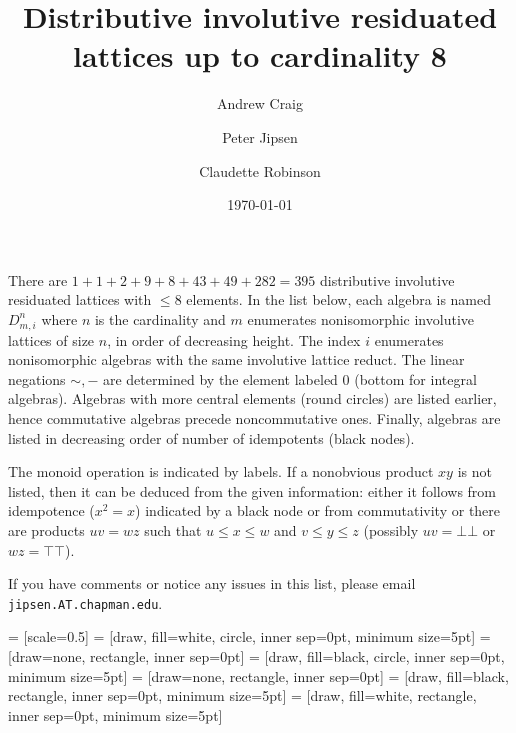 \documentclass{amsart}
\title{Distributive involutive residuated lattices up to cardinality 8}
\author{Andrew Craig}
\author{Peter Jipsen}
\author{Claudette Robinson}
\date{\today}
\begin{document}
\maketitle

\noindent
There are $1+1+2+9+8+43+49+282=395$ distributive involutive residuated lattices with $\le 8$ elements.
In the list below, each algebra is named $D^{n}_{m,i}$ where $n$ is the 
cardinality and $m$ enumerates nonisomorphic involutive lattices of size $n$, in order
of decreasing height. The index $i$ enumerates nonisomorphic algebras with the same involutive lattice
reduct. The linear negations $\sim,-$ are determined by the element labeled $0$ (bottom for integral algebras).
Algebras with more central elements (round 
circles) are listed earlier, hence commutative algebras precede 
noncommutative ones. Finally, algebras are listed in decreasing order of 
number of idempotents (black nodes).

The monoid operation is indicated by labels. If a nonobvious product $xy$ 
is not listed, then it can be deduced from the given information: either
it follows from idempotence ($x^2=x$) indicated by a black node
or from commutativity or there are products $uv=wz$ such that
$u\le x\le w$ and $v\le y\le z$ (possibly $uv=\bot\bot$ or $wz=\top\top$).

If you have comments or notice any issues in this list, please 
email \texttt{jipsen.AT.chapman.edu}.

 = [scale=0.5]
 = [draw, fill=white, circle, inner sep=0pt, minimum size=5pt]
 = [draw=none, rectangle, inner sep=0pt] %
 = [draw, fill=black, circle, inner sep=0pt, minimum size=5pt] %
 = [draw=none, rectangle, inner sep=0pt]
 = [draw, fill=black, rectangle, inner sep=0pt, minimum size=5pt]
 = [draw, fill=white, rectangle, inner sep=0pt, minimum size=5pt]


\setlength{\arraycolsep}{2pt}

\sloppy
\end{document}
